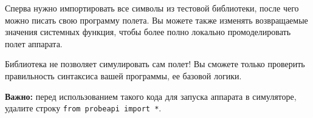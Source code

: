 \documentclass[12pt,a4paper]{article}
\begin{document}
Сперва нужно импортировать все символы из тестовой библиотеки, после чего можно писать
свою программу полета. Вы можете также изменять возвращаемые значения системных функция,
чтобы более полно локально промоделировать полет аппарата.

Библиотека не позволяет симулировать сам полет! Вы сможете только проверить правильность
синтаксиса вашей программы, ее базовой логики.

\textbf{Важно:} перед использованием такого кода для запуска аппарата в симуляторе, удалите строку
\verb'from probeapi import *'.
\end{document}
